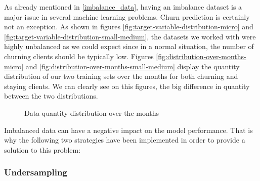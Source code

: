 \documentclass[LaM,binding=0.6cm, english]{sapthesis}
\begin{document}
As already mentioned in \ref{imbalance_data}, having an imbalance dataset is a major issue in several machine learning problems. Churn prediction is certainly not an exception. As shown in figures \ref{fig:target-variable-distribution-micro} and \ref{fig:target-variable-distribution-small-medium}, the datasets we worked with were highly unbalanced as we could expect since in a normal situation, the number of churning clients should be typically low. Figures \ref{fig:distribution-over-months-micro} and \ref{fig:distribution-over-months-small-medium} display the quantity distribution of our two training sets over the months for both churning and staying clients. We can clearly see on this figures, the big difference in quantity between the two distributions.

\begin{figure}[!ht]
  \centering
  \hfill
  \caption{Data quantity distribution over the months}
\end{figure}

Imbalanced data can have a negative impact on the model performance. That is why the following two strategies have been implemented in order to provide a solution to this problem:

\subsubsection{Undersampling}
\end{document}
